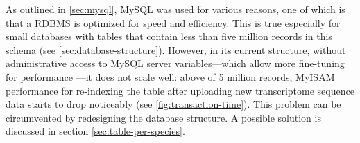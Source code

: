 \label{sec:mysql-performance}
As outlined in \autoref{sec:mysql}, MySQL was used for various reasons, one of
which is that a RDBMS is optimized for speed and efficiency. This is true
especially for small databases with tables that contain less than five million
records in this schema (see \autoref{sec:database-structure}). However, in its
current structure, without administrative access to MySQL server
variables---which allow more fine-tuning for performance
\citep{schwartz2012}---it does not scale well: above of 5 million records,
MyISAM performance for re-indexing the table after uploading new transcriptome
sequence data starts to drop noticeably (see \autoref{fig:transaction-time}). 
This problem can be circumvented by redesigning the database structure. A
possible solution is discussed in section \ref{sec:table-per-species}.



